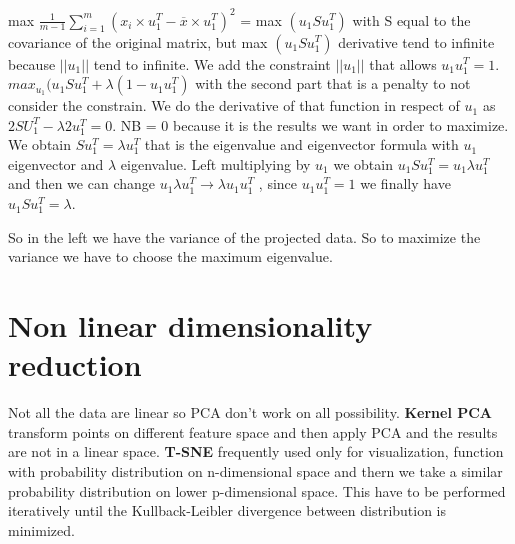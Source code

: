 max $ \frac{1}{m-1} \sum\limits_{i=1}^m (x_i \times u_1^T - \overline{x} \times u_1^T)^2$ =  max $(u_1 S u_1^T)$ with S equal to the covariance of the original matrix, but max $(u_1 S u_1^T)$ derivative tend to infinite because $|| u_1||$ tend to infinite. We add the constraint $|| u_1||$ that allows $u_1 u_1^T =1$.\\
$max_{u_1} (u_1 S u_1^T + \lambda (1 - u_1 u_1^T  ) $ with the second part that is a penalty to not consider the constrain. We do the derivative of that function in respect of $u_1$ as $ 2 S U_1^T - \lambda 2u_1^T = 0 $. NB = 0 because it is the results we want in order to maximize.\\
We obtain $S u_1^T = \lambda u_1^T $ that is the eigenvalue and eigenvector formula with $u_1$ eigenvector and $\lambda$ eigenvalue. Left multiplying by $u_1$ we obtain $u_1 S u_1^T = u_1 \lambda u_1^T $ and then we can change $u_1 \lambda u_1^T \rightarrow \lambda u_1 u_1^T$ , since $ u_1 u_1^T = 1$ we finally have $u_1 S u_1^T = \lambda$.

So in the left we have the variance of the projected data. So to maximize the variance we have to choose the maximum eigenvalue.




\section{Non linear dimensionality reduction}
Not all the data are linear so PCA don't work on all possibility.
\textbf{Kernel PCA} transform points on different feature space and then apply PCA and the results are not in a linear space.
\textbf{T-SNE} frequently used only for visualization, function with probability distribution on n-dimensional space and thern we take a similar probability distribution on lower p-dimensional space. This have to be performed iteratively until the Kullback-Leibler divergence between  distribution is minimized.